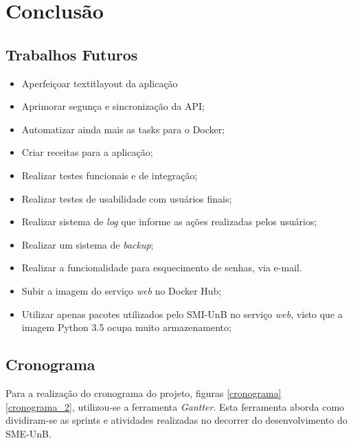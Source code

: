 \chapter{Conclusão}

\section{Trabalhos Futuros}

\begin{itemize}
    \item Aperfeiçoar textit{layout da aplicação}
    \item Aprimorar segunça e sincronização da API;
    \item Automatizar ainda mais as tasks para o Docker;
    \item Criar receitas para a aplicação;
    \item Realizar testes funcionais e de integração;
    \item Realizar testes de usabilidade com usuários finais;
    \item Realizar sistema de \textit{log} que informe as ações realizadas pelos usuários;
    \item Realizar um sistema de \textit{backup};
    \item Realizar a funcionalidade para esquecimento de senhas, via e-mail.
    \item Subir a imagem do serviço \textit{web} no Docker Hub;
    \item Utilizar apenas pacotes utilizados pelo SMI-UnB no serviço \textit{web}, visto que a imagem Python 3.5 ocupa muito armazenamento;
\end{itemize}

\section{Cronograma}
Para a realização do cronograma do projeto, figuras \ref{cronograma} \ref{cronograma_2}, utilizou-se a ferramenta \textit{Gantter}. Esta ferramenta aborda como dividiram-se as sprints e atividades realizadas no decorrer do desenvolvimento do SME-UnB.

